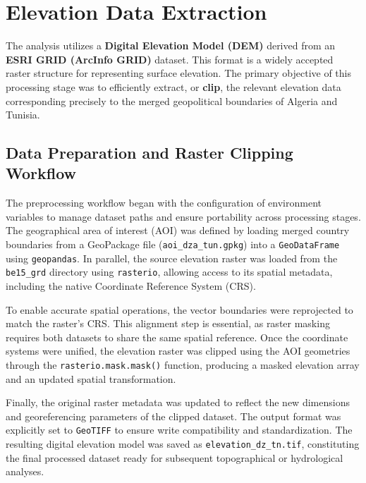 \section{Elevation Data Extraction}

The analysis utilizes a \textbf{Digital Elevation Model (DEM)} derived from an \textbf{ESRI GRID (ArcInfo GRID)} dataset. This format is a widely accepted raster structure for representing surface elevation. The primary objective of this processing stage was to efficiently extract, or \textbf{clip}, the relevant elevation data corresponding precisely to the merged geopolitical boundaries of Algeria and Tunisia.

\subsection{Data Preparation and Raster Clipping Workflow}

The preprocessing workflow began with the configuration of environment variables to manage dataset paths and ensure portability across processing stages. The geographical area of interest (AOI) was defined by loading merged country boundaries from a GeoPackage file (\texttt{aoi\_dza\_tun.gpkg}) into a \texttt{GeoDataFrame} using \texttt{geopandas}. In parallel, the source elevation raster was loaded from the \texttt{be15\_grd} directory using \texttt{rasterio}, allowing access to its spatial metadata, including the native Coordinate Reference System (CRS).

To enable accurate spatial operations, the vector boundaries were reprojected to match the raster’s CRS. This alignment step is essential, as raster masking requires both datasets to share the same spatial reference. Once the coordinate systems were unified, the elevation raster was clipped using the AOI geometries through the \texttt{rasterio.mask.mask()} function, producing a masked elevation array and an updated spatial transformation.

Finally, the original raster metadata was updated to reflect the new dimensions and georeferencing parameters of the clipped dataset. The output format was explicitly set to \texttt{GeoTIFF} to ensure write compatibility and standardization. The resulting digital elevation model was saved as \texttt{elevation\_dz\_tn.tif}, constituting the final processed dataset ready for subsequent topographical or hydrological analyses.



